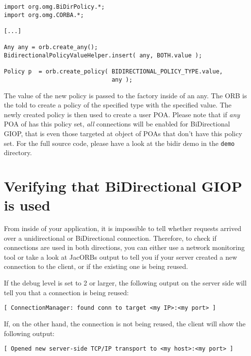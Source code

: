 \documentclass[12pt]{scrbook}
\begin{document}
\begin{verbatim}
import org.omg.BiDirPolicy.*;
import org.omg.CORBA.*;

[...]

Any any = orb.create_any();
BidirectionalPolicyValueHelper.insert( any, BOTH.value );

Policy p  = orb.create_policy( BIDIRECTIONAL_POLICY_TYPE.value,
                               any );
\end{verbatim}

The value of the new policy is passed to the factory inside of an any. The ORB
is the told to create a policy of the specified type with the specified
value. The newly created policy is then used to create a user POA. Please note
that if {\em any} POA of has this policy set, {\em all} connections will be
enabled for BiDirectional GIOP, that is even those targeted at object of POAs
that don't have this policy set. For the full source code, please have a look
at the bidir demo in the {\tt demo} directory.


\section{Verifying that BiDirectional GIOP is used}
From inside of your application, it is impossible to tell whether requests
arrived over a unidirectional or BiDirectional connection. Therefore, to check
if connections are used in both directions, you can either use a network
monitoring tool or take a look at JacORBs output to tell you if your server
created a new connection to the client, or if the existing one is being
reused.

If the debug level is set to 2 or larger, the following output on the server
side will tell you that a connection is being reused:

\begin{verbatim}
[ ConnectionManager: found conn to target <my IP>:<my port> ]
\end{verbatim}

If, on the other hand, the connection is not being reused, the client will
show the following output:
\begin{verbatim}
[ Opened new server-side TCP/IP transport to <my host>:<my port> ]
\end{verbatim}
\end{document}
